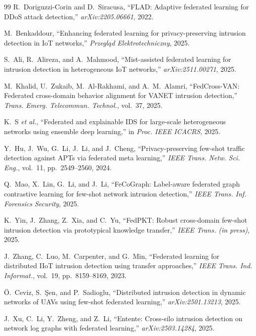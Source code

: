 \documentclass[11pt,a4paper]{article}
\begin{document}
\begin{thebibliography}{99}
R.~Doriguzzi-Corin and D.~Siracusa, ``FLAD: Adaptive federated learning for DDoS
attack detection,'' \emph{arXiv:2205.06661}, 2022.

M.~Benkaddour, ``Enhancing federated learning for privacy-preserving intrusion
detection in IoT networks,'' \emph{Przegl\k{a}d Elektrotechniczny}, 2025.

S.~Ali, R.~Alireza, and A.~Mahmood, ``Mist-assisted federated learning for
intrusion detection in heterogeneous IoT networks,'' \emph{arXiv:2511.00271},
2025.

M.~Khalid, U.~Zukaib, M.~Al-Rakhami, and A.~M.~Alamri, ``FedCross-VAN: Federated
cross-domain behavior alignment for VANET intrusion detection,'' \emph{Trans.
Emerg. Telecommun. Technol.}, vol.~37, 2025.

K.~S \emph{et al.}, ``Federated and explainable IDS for large-scale heterogeneous
networks using ensemble deep learning,'' in \emph{Proc. IEEE ICACRS}, 2025.

Y.~Hu, J.~Wu, G.~Li, J.~Li, and J.~Cheng, ``Privacy-preserving few-shot traffic
detection against APTs via federated meta learning,'' \emph{IEEE Trans. Netw.
Sci. Eng.}, vol.~11, pp.~2549--2560, 2024.

Q.~Mao, X.~Lin, G.~Li, and J.~Li, ``FeCoGraph: Label-aware federated graph
contrastive learning for few-shot network intrusion detection,'' \emph{IEEE Trans.
Inf. Forensics Security}, 2025.

K.~Yin, J.~Zhang, Z.~Xia, and C.~Yu, ``FedPKT: Robust cross-domain few-shot
intrusion detection via prototypical knowledge transfer,'' \emph{IEEE Trans. (in
press)}, 2025.

J.~Zhang, C.~Luo, M.~Carpenter, and G.~Min, ``Federated learning for distributed
IIoT intrusion detection using transfer approaches,'' \emph{IEEE Trans. Ind.
Informat.}, vol.~19, pp.~8159--8169, 2023.

\"{O}.~Ceviz, S.~\c{S}en, and P.~Sadioglu, ``Distributed intrusion detection in
dynamic networks of UAVs using few-shot federated learning,''
\emph{arXiv:2501.13213}, 2025.

J.~Xu, C.~Li, Y.~Zheng, and Z.~Li, ``Entente: Cross-silo intrusion detection on
network log graphs with federated learning,'' \emph{arXiv:2503.14284}, 2025.


\end{thebibliography}
\end{document}

